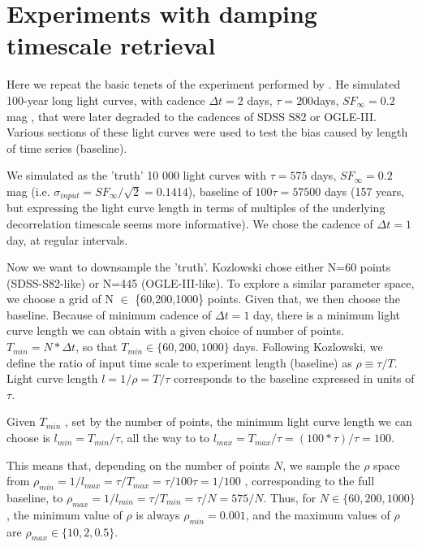 \documentclass[fleqn,usenatbib]{mnras}  %
\begin{document}
\section{Experiments with damping timescale retrieval }

Here we repeat the basic tenets of the experiment performed by \citep{kozlowski2017a}. He simulated 100-year long light curves, with cadence $\Delta t= 2 $ days, $\tau = 200 $days, $SF_{\infty} = 0.2$ mag , that were later degraded to the cadences of SDSS S82 or OGLE-III. Various sections of these light curves were used to test the bias caused by length of time series (baseline). 


We simulated as the 'truth'  10 000 light curves with $\tau=575 $ days, $SF_{\infty}=0.2$ mag  (i.e.  $\sigma_{input} =SF_{\infty} /\sqrt{2} = 0.1414  $), baseline of $100 \tau = 57500$ days (157 years, but expressing the light curve length in terms of multiples of the underlying decorrelation timescale seems more informative). We chose the cadence of $\Delta t=1$ day, at regular intervals.


Now we want to downsample the 'truth'. Kozlowski chose either N=60 points (SDSS-S82-like) or N=445 (OGLE-III-like). To explore a similar parameter space, we choose a grid of N $\in$ \{60,200,1000\} points. Given that, we then choose the baseline.  Because of minimum cadence of $\Delta t = 1$ day, there is a minimum light curve length we can obtain with a given  choice of number of points.   $T_{min}= N * \Delta t$, so that $T_{min} \in \{60,200,1000\} $ days. Following Kozlowski, we define the ratio of input time scale to  experiment length (baseline) as $\rho \equiv \tau / T$. Light curve length  $l = 1 / \rho = T / \tau$ corresponds to the baseline expressed in units of $\tau$. 

Given  $T_{min}$ , set by the number of points, the minimum light curve length we can choose is  $l_{min} = T_{min} / \tau$, all the way to to $  l_{max} = T_{max} / \tau = (100 * \tau )/ \tau = 100$.  

This means that, depending on the number of points $N$, we sample the  $\rho$ space from $\rho_{min} = 1 / l_{max} = \tau / T_{max} = \tau / 100 \tau = 1 / 100 $ , corresponding to the full baseline,  to  $\rho_{max} = 1 / l_{min} = \tau / T_{min} = \tau / N = 575 / N $. Thus, for  $N \in \{60,200,1000\}$,  the minimum value of $\rho$ is always $\rho_{min} = 0.001$, and the maximum values of $\rho$ are $\rho_{max} \in \{10,2,0.5\}$. 
\end{document}
